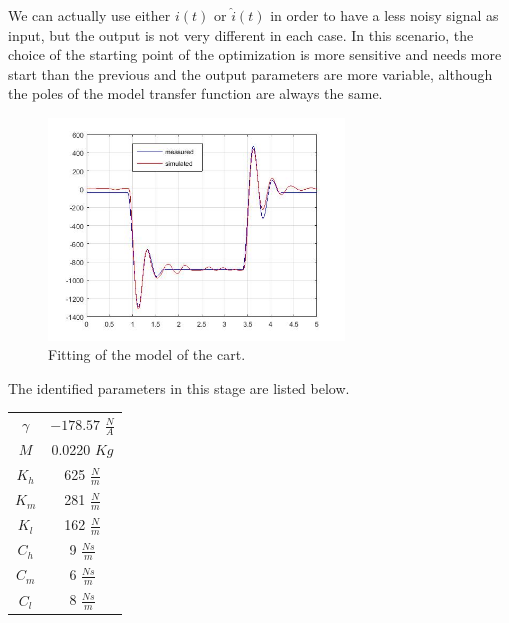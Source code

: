 We can actually use either $i(t)$ or $\hat{i}(t)$ in order to have a less noisy signal as input, but the output is not very different in each case. In this scenario, the choice of the starting point of the optimization is more sensitive and needs more start than the previous and the output parameters are more variable, although the poles of the model transfer function are always the same.
\begin{figure}[h]
\includegraphics[width=0.7\textwidth]{img/graybox_cart.jpg}
\caption{Fitting of the model of the cart.}
\end{figure}

The identified parameters in this stage are listed below.
\begin{table}
\centering
\begin{tabular}{|c|c|}
$\gamma$ & $-178.57$ $\frac{N}{A}$ \\
$M$ & 0.0220 $Kg$ \\
$K_h$ & 625 $\frac{N}{m}$\\
$K_m$ & 281 $\frac{N}{m}$\\
$K_l$ & 162 $\frac{N}{m}$\\
$C_h$ & 9 $\frac{Ns}{m}$\\
$C_m$ & 6 $\frac{Ns}{m}$\\
$C_l$ & 8 $\frac{Ns}{m}$\\
\end{tabular}
\end{table}
